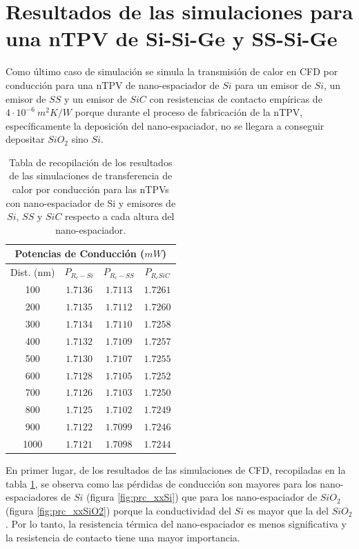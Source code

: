 \section{Resultados de las simulaciones para una nTPV de Si-Si-Ge y SS-Si-Ge}\label{sec:res_XxSiGe}
\graphicspath{ {./figuras/Resultados/DiffMatEsp} }
Como último caso de simulación se simula la transmisión de calor en CFD por conducción para una nTPV de nano-espaciador de $Si$ para un emisor de $Si$, un emisor de $SS$ y un emisor de $SiC$ con resistencias de contacto empíricas de $4\cdot 10^{-6} \ m^2 K/W$ porque durante el proceso de fabricación de la nTPV, específicamente la deposición del nano-espaciador, no se llegara a conseguir depositar $SiO_2$ sino $Si$.
\begin{table}[H]
	\centering
		\begin{tabular}{|c||c|c|c|}
		\hline
		 \multicolumn{4}{|c|}{\textbf{Potencias de Conducción ($mW$)}}\\	\hline
		Dist. (nm)&$P_{R_c-Si}$&$P_{R_c-SS}$&$P_{R_cSiC}$\\ \hline \hline 
		100&$1.7136$&$1.7113$&$1.7261$\\ \hline 
		200&$1.7135$&$1.7112$&$1.7260$\\ \hline 
		300&$1.7134$&$1.7110$&$1.7258$\\ \hline 
		400&$1.7132$&$1.7109$&$1.7257$\\ \hline 
		500&$1.7130$&$1.7107$&$1.7255$\\ \hline 
		600&$1.7128$&$1.7105$&$1.7252$\\ \hline 
		700&$1.7126$&$1.7103$&$1.7250$\\ \hline 
		800&$1.7125$&$1.7102$&$1.7249$\\ \hline 
		900&$1.7122$&$1.7099$&$1.7246$\\ \hline 
		1000&$1.7121$&$1.7098$&$1.7244$\\ \hline
		\end{tabular}
	\caption{Tabla de recopilación de los resultados de las simulaciones de transferencia de calor por conducción para las nTPVs con nano-espaciador de Si y emisores de $Si$, $SS$ y $SiC$ respecto a cada altura del nano-espaciador.}
	\label{tab:nanoEspaciadorDeSi}
\end{table}
En primer lugar, de los resultados de las simulaciones de CFD, recopiladas en la tabla \ref{tab:nanoEspaciadorDeSi}, se observa como las pérdidas de conducción son mayores para los nano-espaciadores de $Si$ (figura \ref{fig:prc_xxSi}) que para los nano-espaciador de $SiO_2$ (figura \ref{fig:prc_xxSiO2}) porque la conductividad del $Si$ es mayor que la del $SiO_2$. Por lo tanto, la resistencia térmica del nano-espaciador es menos significativa y la resistencia de contacto tiene una mayor importancia.
